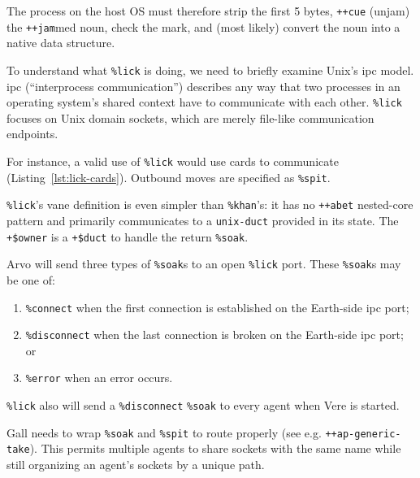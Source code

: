 \documentclass[twoside]{article}
\begin{document}
The process on the host OS must therefore strip the first 5 bytes, \lstinline[style=inlinecode]{++cue} (unjam) the \lstinline[style=inlinecode]{++jam}med noun, check the mark, and (most likely) convert the noun into a native data structure.

To understand what \texttt{\%lick} is doing, we need to briefly examine Unix's {\sc ipc} model.  {\sc ipc} (``interprocess communication'') describes any way that two processes in an operating system's shared context have to communicate with each other.  \texttt{\%lick} focuses on Unix domain sockets, which are merely file-like communication endpoints.

For instance, a valid use of \texttt{\%lick} would use cards to communicate (Listing~\ref{lst:lick-cards}).  Outbound moves are specified as \lstinline[style=inlinecode]{%spit}.

\texttt{\%lick}'s vane definition is even simpler than \texttt{\%khan}'s:  it has no \texttt{++abet} nested-core pattern and primarily communicates to a \texttt{unix-duct} provided in its state.  The \lstinline[style=inlinecode]{+$owner} is a \lstinline[style=inlinecode]{+$duct} to handle the return \lstinline[style=inlinecode]{%soak}.

Arvo will send three types of \lstinline[style=inlinecode]{%soak}s to an open \texttt{\%lick} port.  These \lstinline[style=inlinecode]{%soak}s may be one of:

\begin{enumerate}
  \item  \lstinline[style=inlinecode]{%connect} when the first connection is established on the Earth-side {\sc ipc} port;
  \item  \lstinline[style=inlinecode]{%disconnect} when the last connection is broken on the Earth-side {\sc ipc} port; or
  \item  \lstinline[style=inlinecode]{%error} when an error occurs.
\end{enumerate}
\noindent
\texttt{\%lick} also will send a \lstinline[style=inlinecode]{%disconnect} \lstinline[style=inlinecode]{%soak} to every agent when Vere is started.

Gall needs to wrap \lstinline[style=inlinecode]{%soak} and \lstinline[style=inlinecode]{%spit} to route properly (see e.g. \lstinline[style=inlinecode]{++ap-generic-take}).  This permits multiple agents to share sockets with the same name while still organizing an agent's sockets by a unique path.
\end{document}
